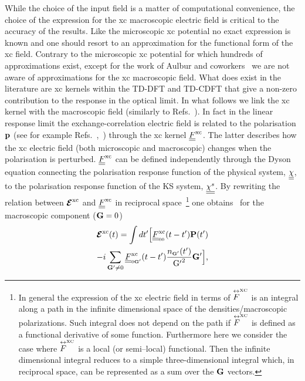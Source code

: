 While the choice of the input field is a matter of computational convenience, the choice of the expression for the xc macroscopic electric field is critical to the accuracy of the results. Like the microscopic xc potential no exact expression is known and one should resort to an approximation for the functional form of the xc field. Contrary to the microscopic xc potential for which hundreds of approximations exist,\cite{libxc} except for the work of Aulbur and coworkers~\cite{aulbur1996polarization} we are not aware of approximations for the xc macroscopic field. What does exist in the literature are xc kernels within the TD-DFT and TD-CDFT that give a non-zero contribution to the response in the optical limit. In what follows we link the xc kernel with the macroscopic field (similarly to Refs.~\cite{maitra2003current,PhysRevLett.115.137402}). 
In fact in the linear response limit the exchange-correlation electric field is related to the polarisation ${\bf p}$ (see for example Refs.~\cite{maitra2003current},~\cite{PhysRevLett.115.137402})
through the xc kernel $\underline{\underline{F}}^{\text{xc}}_{}$. The latter describes how the xc electric field (both microscopic and macroscopic) changes when the polarisation is perturbed. $\underline{\underline{F}}^{\text{xc}}_{}$ can be defined independently through the Dyson equation connecting 
the polarisation response function of the physical system, $\underline{\underline{\chi}}$,
to the polarisation response function of the KS system, $\underline{\underline{\chi^s}}$. 
By rewriting the relation between $\boldsymbol{\cal E}^{\text{xc}}$ and $\underline{\underline{F}}^{\text{xc}}_{}$ in reciprocal space~\footnote{In general the expression of the xc electric field in terms of $\overset\leftrightarrow{F}^{\scriptscriptstyle\rm XC}_{}$ is an integral along a path in the infinite dimensional space of the densities/macroscopic polarizations. Such integral does not depend on the path if $\overset\leftrightarrow{F}^{\scriptscriptstyle\rm XC}_{}$ is defined as a functional derivative of some function. Furthermore here we consider the case where $\overset\leftrightarrow{F}^{\scriptscriptstyle\rm XC}_{}$ is a local (or semi--local) functional. Then the infinite dimensional integral reduces to a simple three-dimensional integral which, in reciprocal space, can be represented as a sum over the ${\bf G}$ vectors.} one obtains~\cite{maitra2003current} for the macroscopic component (${\bf G}=0$) 
\begin{multline}
\boldsymbol{\cal E}^{\text{xc}}(t)= \int dt' \Big[ \underline{\underline{F}}^{\text{xc}}_{\scriptscriptstyle\rm 00}(t-t') {\bf P}(t')  \\
               -{i} \sum_{{\bf G}' \neq 0} \underline{\underline{F}}^{\text{xc}}_{\scriptscriptstyle\rm 0{\bf G}'}(t-t')\frac{ n_{\scriptscriptstyle\rm {\bf G}'}(t')}{{\rm G'}^2}{\bf G}' \Big] 
\label{Excmac}
\text{,}
\end{multline}
